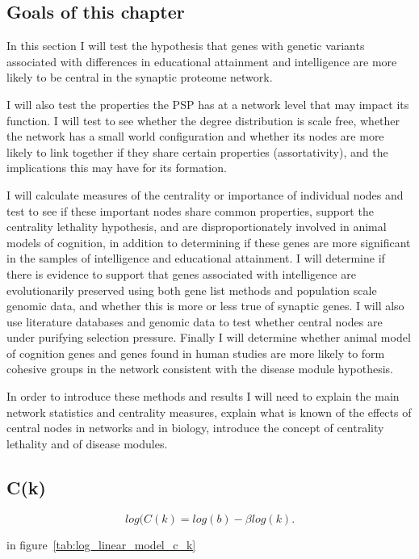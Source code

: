 \subsection{Goals of this chapter}

In this section I will test the hypothesis that genes with genetic variants associated with differences in educational attainment and intelligence are more likely to be central in the synaptic proteome network.

I will also test the properties the PSP has at a network level that may impact its function. I will test to see whether the degree distribution is scale free, whether the network has a small world configuration and whether its nodes are more likely to link together if they share certain properties (assortativity), and the implications this may have for its formation. 

I will calculate measures of the centrality or importance of individual nodes and test to see if these important nodes share common properties, support the centrality lethality hypothesis, and are disproportionately involved in animal models of cognition, in addition to determining if these genes are more significant in the samples of intelligence and educational attainment. I will determine if there is evidence to support that genes associated with intelligence are evolutionarily preserved using both gene list methods and population scale genomic data, and whether this is more or less true of synaptic genes. I will also use literature databases and genomic data to test whether central nodes are under purifying selection pressure. Finally I will determine whether animal model of cognition genes and genes found in human studies are more likely to form cohesive groups in the network consistent with the disease module hypothesis. 

In order to introduce these methods and results I will need to explain the main network statistics and centrality measures, explain what is known of the effects of central nodes in networks and in biology, introduce the concept of centrality lethality and of disease modules. 
\subsection{C(k)}
\begin{equation}
    log(C(k) = log(b) - \beta log(k).
\end{equation}


 in figure~\ref{tab:log_linear_model_c_k}
 
